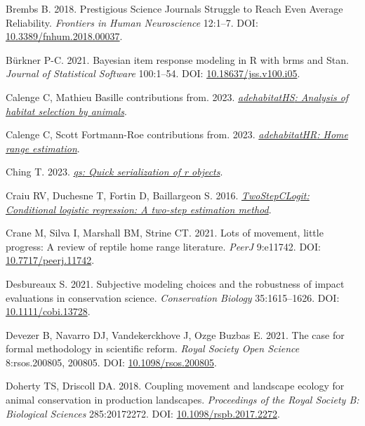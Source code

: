 \documentclass[10pt,a4paper]{article}
\newlength{\cslhangindent}
\newlength{\cslentryspacingunit} %
\newenvironment{CSLReferences}[2] %
 {%
  \setlength{\parindent}{0pt}
  \ifodd #1
  \let\oldpar\par
  \def\par{\hangindent=\cslhangindent\oldpar}
  \fi
  \setlength{\parskip}{#2\cslentryspacingunit}
 }%
 {}
\begin{document}
\begin{CSLReferences}{1}{0}
Brembs B. 2018. Prestigious {Science} {Journals} {Struggle} to {Reach} {Even} {Average} {Reliability}. \emph{Frontiers in Human Neuroscience} 12:1--7. DOI: \href{https://doi.org/10.3389/fnhum.2018.00037}{10.3389/fnhum.2018.00037}.

Bürkner P-C. 2021. Bayesian item response modeling in {R} with {brms} and {Stan}. \emph{Journal of Statistical Software} 100:1--54. DOI: \href{https://doi.org/10.18637/jss.v100.i05}{10.18637/jss.v100.i05}.

Calenge C, Mathieu Basille contributions from. 2023. \emph{\href{https://CRAN.R-project.org/package=adehabitatHS}{{adehabitatHS}: Analysis of habitat selection by animals}}.

Calenge C, Scott Fortmann-Roe contributions from. 2023. \emph{\href{https://CRAN.R-project.org/package=adehabitatHR}{{adehabitatHR}: Home range estimation}}.

Ching T. 2023. \emph{\href{https://CRAN.R-project.org/package=qs}{{qs}: Quick serialization of r objects}}.

Craiu RV, Duchesne T, Fortin D, Baillargeon S. 2016. \emph{\href{https://CRAN.R-project.org/package=TwoStepCLogit}{TwoStepCLogit: Conditional logistic regression: A two-step estimation method}}.

Crane M, Silva I, Marshall BM, Strine CT. 2021. Lots of movement, little progress: A review of reptile home range literature. \emph{PeerJ} 9:e11742. DOI: \href{https://doi.org/10.7717/peerj.11742}{10.7717/peerj.11742}.

Desbureaux S. 2021. Subjective modeling choices and the robustness of impact evaluations in conservation science. \emph{Conservation Biology} 35:1615--1626. DOI: \href{https://doi.org/10.1111/cobi.13728}{10.1111/cobi.13728}.

Devezer B, Navarro DJ, Vandekerckhove J, Ozge Buzbas E. 2021. The case for formal methodology in scientific reform. \emph{Royal Society Open Science} 8:rsos.200805, 200805. DOI: \href{https://doi.org/10.1098/rsos.200805}{10.1098/rsos.200805}.

Doherty TS, Driscoll DA. 2018. Coupling movement and landscape ecology for animal conservation in production landscapes. \emph{Proceedings of the Royal Society B: Biological Sciences} 285:20172272. DOI: \href{https://doi.org/10.1098/rspb.2017.2272}{10.1098/rspb.2017.2272}.


\end{CSLReferences}
\end{document}
